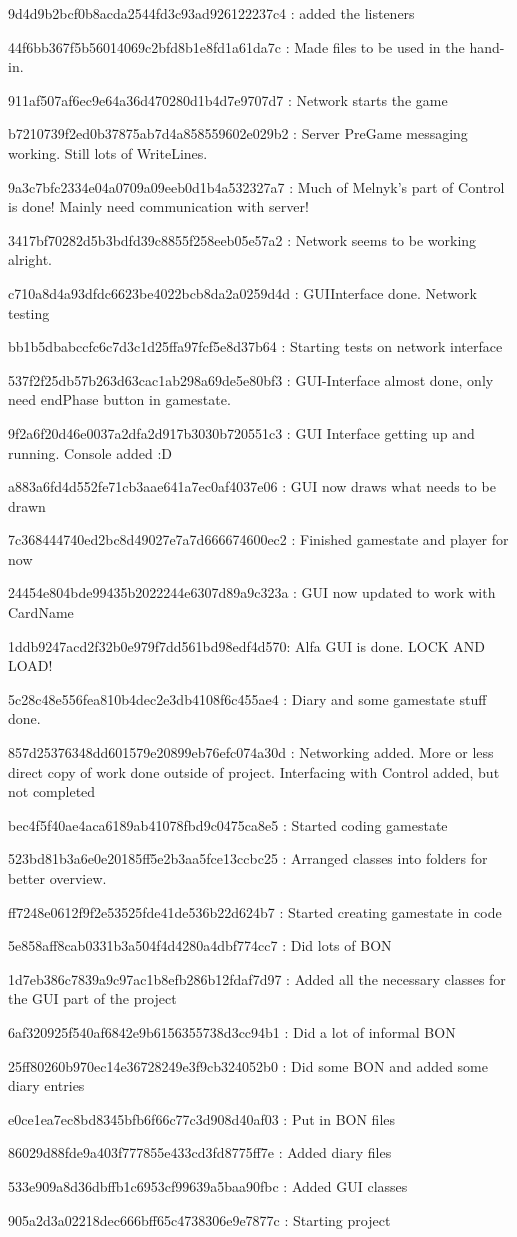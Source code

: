 9d4d9b2bcf0b8acda2544fd3c93ad926122237c4 : added the listeners

44f6bb367f5b56014069c2bfd8b1e8fd1a61da7c : Made files to be used in the hand-in.

911af507af6ec9e64a36d470280d1b4d7e9707d7 : Network starts the game

b7210739f2ed0b37875ab7d4a858559602e029b2 : Server PreGame messaging working. Still lots of WriteLines.

9a3c7bfc2334e04a0709a09eeb0d1b4a532327a7 : Much of Melnyk's part of Control is done! Mainly need communication with server!

3417bf70282d5b3bdfd39c8855f258eeb05e57a2 : Network seems to be working alright.

c710a8d4a93dfdc6623be4022bcb8da2a0259d4d : GUIInterface done. Network testing

bb1b5dbabccfc6c7d3c1d25ffa97fcf5e8d37b64 : Starting tests on network interface

537f2f25db57b263d63cac1ab298a69de5e80bf3 : GUI-Interface almost done, only need endPhase button in gamestate.

9f2a6f20d46e0037a2dfa2d917b3030b720551c3 : GUI Interface getting up and running. Console added :D

a883a6fd4d552fe71cb3aae641a7ec0af4037e06 : GUI now draws what needs to be drawn

7c368444740ed2bc8d49027e7a7d666674600ec2 : Finished gamestate and player for now

24454e804bde99435b2022244e6307d89a9c323a : GUI now updated to work with CardName

1ddb9247acd2f32b0e979f7dd561bd98edf4d570: Alfa GUI is done. LOCK AND LOAD!

5c28c48e556fea810b4dec2e3db4108f6c455ae4 : Diary and some gamestate stuff done.

857d25376348dd601579e20899eb76efc074a30d : Networking added. More or less direct copy of work done outside of project. Interfacing with Control added, but not completed

bec4f5f40ae4aca6189ab41078fbd9c0475ca8e5 : Started coding gamestate

523bd81b3a6e0e20185ff5e2b3aa5fce13ccbc25 : Arranged classes into folders for better overview.

ff7248e0612f9f2e53525fde41de536b22d624b7 : Started creating gamestate in code

5e858aff8cab0331b3a504f4d4280a4dbf774cc7 : Did lots of BON

1d7eb386c7839a9c97ac1b8efb286b12fdaf7d97 : Added all the necessary classes for the GUI part of the project

6af320925f540af6842e9b6156355738d3cc94b1 : Did a lot of informal BON

25ff80260b970ec14e36728249e3f9cb324052b0 : Did some BON and added some diary entries

e0ce1ea7ec8bd8345bfb6f66c77c3d908d40af03 : Put in BON files

86029d88fde9a403f777855e433cd3fd8775ff7e : Added diary files

533e909a8d36dbffb1c6953cf99639a5baa90fbc  : Added GUI classes 

905a2d3a02218dec666bff65c4738306e9e7877c : Starting project 